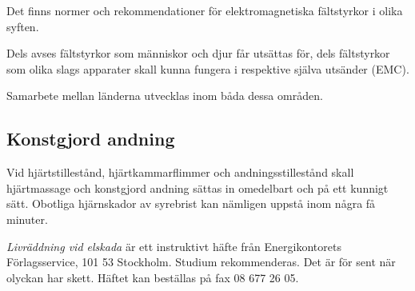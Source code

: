 Det finns normer och rekommendationer för elektromagnetiska
fältstyrkor i olika syften.

Dels avses fältstyrkor som människor och djur får utsättas för, dels
fältstyrkor som olika slags apparater skall kunna fungera i respektive
själva utsänder (EMC).

Samarbete mellan länderna utvecklas inom båda dessa områden.

\subsection{Konstgjord andning}

Vid hjärtstillestånd, hjärtkammarflimmer och andningsstillestånd skall
hjärtmassage och konstgjord andning sättas in omedelbart och på ett
kunnigt sätt. Obotliga hjärnskador av syrebrist kan nämligen uppstå
inom några få minuter.

\emph{Livräddning vid elskada} är ett instruktivt häfte från
Energikontorets Förlagsservice, 101 53 Stockholm. Studium
rekommenderas.  Det är för sent när olyckan har skett. Häftet kan
beställas på fax 08 677 26 05.

